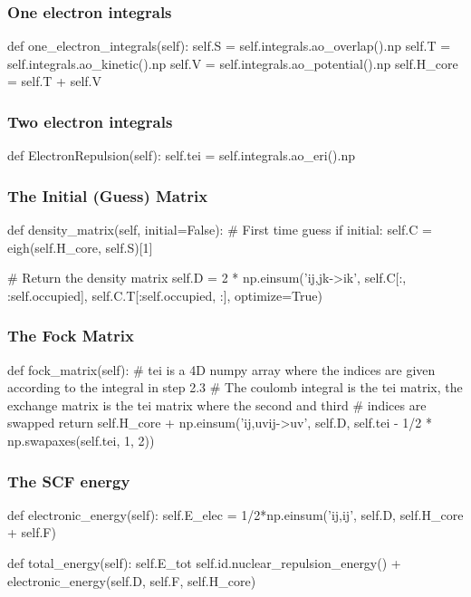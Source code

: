 \documentclass{beamer}
\begin{document}
\begin{frame}[fragile]
    \frametitle{One electron integrals}
    \begin{python}
def one_electron_integrals(self):
    self.S = self.integrals.ao_overlap().np
    self.T = self.integrals.ao_kinetic().np
    self.V = self.integrals.ao_potential().np
    self.H_core = self.T + self.V 
    \end{python}
\end{frame}

\begin{frame}[fragile]
    \frametitle{Two electron integrals}
    \begin{python}
def ElectronRepulsion(self):
    self.tei = self.integrals.ao_eri().np
    \end{python}
\end{frame}

\begin{frame}[fragile]
    \frametitle{The Initial (Guess) Matrix}
    \begin{python}
def density_matrix(self, initial=False):  
    # First time guess
    if initial:        
        self.C = eigh(self.H_core, self.S)[1]
    
    # Return the density matrix
    self.D = 2 * np.einsum('ij,jk->ik', self.C[:, :self.occupied], self.C.T[:self.occupied, :], optimize=True)
    \end{python}
\end{frame}

\begin{frame}[fragile]
    \frametitle{The Fock Matrix}
    \begin{python}
def fock_matrix(self):
    # tei is a 4D numpy array where the indices are given according to the integral in step 2.3
    # The coulomb integral is the tei matrix, the exchange matrix is the tei matrix where the second and third
    # indices are swapped
    return self.H_core + np.einsum('ij,uvij->uv', self.D, self.tei - 1/2 * np.swapaxes(self.tei, 1, 2))
    \end{python}
\end{frame}

\begin{frame}[fragile]
    \frametitle{The SCF energy}
    \begin{python}
def electronic_energy(self):
    self.E_elec = 1/2*np.einsum('ij,ij', self.D, self.H_core + self.F)

def total_energy(self):
    self.E_tot self.id.nuclear_repulsion_energy() + electronic_energy(self.D, self.F, self.H_core)
    \end{python}
\end{frame}
\end{document}

